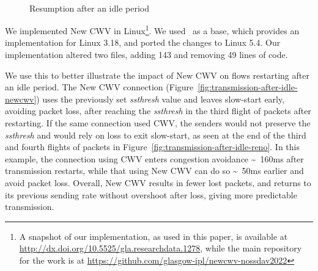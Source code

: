 \documentclass[10pt, acmlarge]{acmart}
\begin{document}
\begin{figure}[t!]
  \centering
  ~
  \caption{Resumption after an idle period}
  \label{fig:transmission-after-idle}
\end{figure}

We implemented New CWV in Linux\footnote{A snapshot of our implementation, as used in this 
paper, is available at \url{http://dx.doi.org/10.5525/gla.researchdata.1278},
while the main repository for the work is at 
\url{https://github.com/glasgow-ipl/newcwv-nossdav2022}}. We used~\cite{secchi-2016-newcwv}
 as a base, which provides an implementation for Linux 3.18, and ported the changes to 
 Linux 5.4. Our implementation altered two files, adding 143 and removing 49 lines of code.

We use this to better illustrate the impact of New CWV on flows restarting after an idle period.
The New CWV connection (Figure~\ref{fig:transmission-after-idle-newcwv}) uses the previously
set \emph{ssthresh} value and leaves slow-start early, avoiding packet loss, after 
reaching the \emph{ssthresh} in the third flight of packets after restarting. 
If the same connection used CWV, the senders would not preserve the \emph{ssthresh} 
and would rely on loss to exit slow-start, as seen at the end of the third and fourth 
flights of packets in Figure~\ref{fig:transmission-after-idle-reno}. 
In this example, the connection using CWV enters congestion avoidance 
\textasciitilde~160ms after transmission restarts, while that using New CWV can do so 
\textasciitilde~50ms earlier and avoid packet loss.
Overall, New CWV results in fewer lost packets, and returns to its previous sending rate 
without overshoot after loss, giving more predictable transmission.
\end{document}
